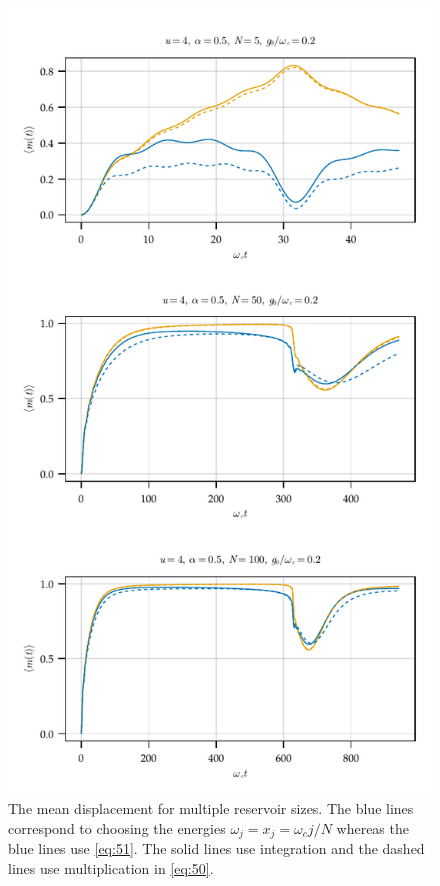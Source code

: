 \documentclass[fontsize=10pt,paper=b5,open=any,
twoside=no,toc=listof,toc=bibliography,headings=optiontohead,
captions=nooneline,captions=tableabove,english,DIV=15,numbers=noenddot,final,parskip=half-,
headinclude=true,footinclude=false,BCOR=0mm]{scrartcl}
\begin{document}
\begin{figure}[p]
  \centering
  \includegraphics{plots/mean_displacement_complicated_vs_simple_energy}
  \caption{\label{fig:mean_displacement_benchmark} The mean
    displacement for multiple reservoir sizes. The blue lines
    correspond to choosing the energies \(ω_{j}=x_{j}=ω_{c} j/N\)
    whereas the blue lines use \cref{eq:51}. The solid lines use
    integration and the dashed lines use multiplication in \cref{eq:50}.}
\end{figure}
\end{document}
